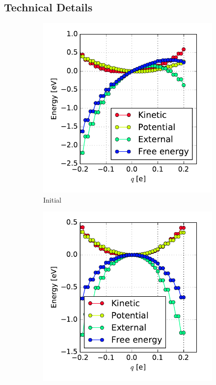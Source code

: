 \subsection{Technical Details}
\label{section_technical_issues}
\begin{figure}
	\centering
	\begin{subfigure}{0.45\textwidth}
		\centering
		\includegraphics[width = \textwidth]{Images/Hydrogen/charging/energy_contributions_asymmetric}
		\caption{Initial}
		\label{image_contributions_initial}
	\end{subfigure}\hspace*{1cm}
	\begin{subfigure}{0.45\textwidth}
		\centering
		\includegraphics[width = \textwidth]{Images/Hydrogen/charging/energy_contributions_symmetric}

\end{subfigure}
\end{figure}
